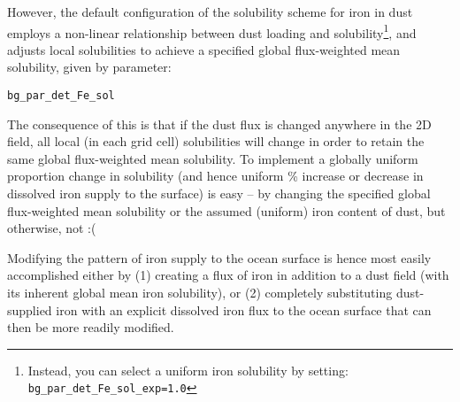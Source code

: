 However, the default configuration of the solubility scheme for iron in dust employs a non-linear relationship between dust loading and solubility\footnote{Instead, you can select a uniform iron solubility by setting: \texttt{bg\_par\_det\_Fe\_sol\_exp=1.0}}, and adjusts local solubilities to achieve a specified global flux-weighted mean solubility, given by parameter:
\vspace{-1mm}\begin{verbatim}
bg_par_det_Fe_sol
\end{verbatim}\vspace{-1mm}
\noindent The consequence of this is that if the dust flux is changed anywhere in the 2D field, all local (in each grid cell) solubilities will change in order to retain the same global flux-weighted mean solubility. To implement a globally uniform proportion change in solubility (and hence uniform \% increase or decrease in dissolved iron supply to the surface) is easy -- by changing the specified global flux-weighted mean solubility or the assumed (uniform) iron content of dust, but otherwise, not :(

Modifying the pattern of iron supply to the ocean surface is hence most easily accomplished either by (1) creating a flux of iron in addition to  a dust field (with its inherent global mean iron solubility), or (2) completely substituting dust-supplied iron with an explicit dissolved iron flux to the ocean surface that can then be more readily modified. 

